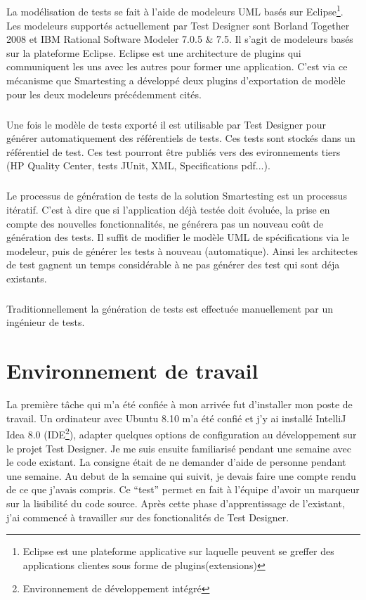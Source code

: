 \subparagraph*{}
La modélisation de tests se fait à l'aide de modeleurs UML basés sur Eclipse\footnote{Eclipse est une plateforme applicative sur laquelle peuvent se greffer des applications clientes sous forme de plugins(extensions)}. Les modeleurs supportés actuellement par Test Designer sont Borland Together 2008 et IBM Rational Software Modeler 7.0.5 \& 7.5. Il s'agit de modeleurs basés sur la plateforme Eclipse. Eclipse est une architecture de plugins qui communiquent les uns avec les autres pour former une application. C'est via ce mécanisme que Smartesting a développé deux plugins d'exportation de modèle pour les deux modeleurs précédemment cités.

\subparagraph*{}
Une fois le modèle de tests exporté il est utilisable par Test Designer pour générer automatiquement des référentiels de tests. Ces tests sont stockés dans un référentiel de test. Ces test pourront être publiés vers des evironnements tiers (HP Quality Center, tests JUnit, XML, Specifications pdf...).

\subparagraph*{}
Le processus de génération de tests de la solution Smartesting est un processus itératif. C'est à dire que si l'application déjà testée doit évoluée, la prise en compte des nouvelles fonctionnalités, ne générera pas un nouveau coût de génération des tests. 
Il suffit de modifier le modèle UML de spécifications via le modeleur, puis de générer les tests à nouveau (automatique). Ainsi les architectes de test gagnent un temps considérable à ne pas générer des test qui sont déja existants.

\subparagraph*{}
Traditionnellement la génération de tests est effectuée manuellement par un ingénieur de tests.

\section{Environnement de travail}
La première tâche qui m'a été confiée à mon arrivée fut d'installer mon poste de travail. Un ordinateur avec Ubuntu 8.10 m'a été confié et j'y ai installé IntelliJ Idea 8.0 (IDE\footnote{Environnement de développement intégré}), adapter quelques options de configuration au développement sur le projet Test Designer. Je me suis ensuite familiarisé pendant une semaine avec le code existant. La consigne était de ne demander d'aide de personne pendant une semaine. Au debut de la semaine qui suivit, je devais faire une compte rendu de ce que j'avais compris. Ce ``test'' permet en fait à l'équipe d'avoir un  marqueur sur la lisibilité du code source. Après cette phase d'apprentissage de l'existant, j'ai commencé à travailler sur des fonctionalités de Test Designer.

